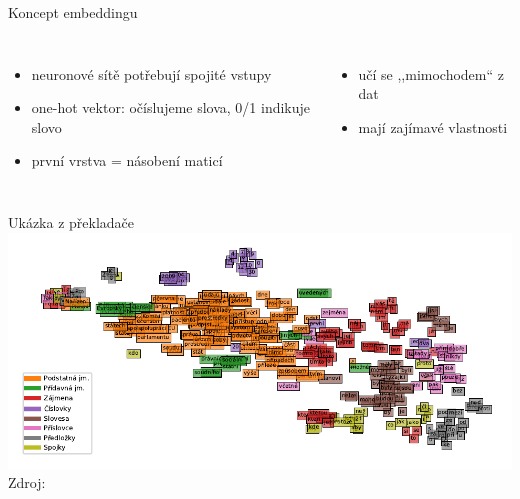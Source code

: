 \documentclass[handout,aspectratio=169,dvipsnames]{beamer}
\begin{document}
\begin{frame}{Koncept embeddingu}

    \begin{columns}

    \begin{itemize}[<+->]

        \item neuronové sítě potřebují spojité vstupy

        \item one-hot vektor: očíslujeme slova, 0/1 indikuje slovo \\[1em]
            \scalebox{.9}{}

        \item první vrstva = násobení maticí

    \end{itemize}


        \vspace{15pt}

        \begin{itemize}

            \item<5-> učí se ,,mimochodem`` z dat

            \item<6-> mají zajímavé vlastnosti

        \end{itemize}

    \end{columns}

\end{frame}


\begin{frame}{Ukázka z překladače}
    \hspace*{-10pt}\includegraphics{./plots/tsne.pdf} \\
    \tiny Zdroj: \citet{rozhledy}
\end{frame}
\end{document}
